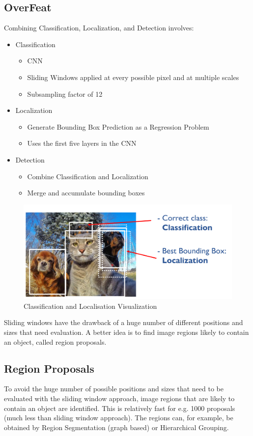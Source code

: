 \subsection{OverFeat}
Combining Classification, Localization, and Detection involves:
\begin{itemize}
	\item Classification
	\begin{itemize}
		\item CNN
		\item Sliding Windows applied at every possible pixel and at multiple scales
		\item Subsampling factor of 12
	\end{itemize}
	\item Localization
	\begin{itemize}
		\item Generate Bounding Box Prediction as a Regression Problem
		\item Uses the first five layers in the CNN
	\end{itemize}
	\item Detection
	\begin{itemize}
		\item Combine Classification and Localization
		\item Merge and accumulate bounding boxes
	\end{itemize}
\end{itemize}

\begin{figure}[h]
	\centering
	\includegraphics[width=0.7\linewidth]{img/classification_localisation}
	\caption{Classification and Localisation Visualization}
	\label{fig:classificationlocalisation}
\end{figure}

Sliding windows have the drawback of a huge number of different positions and sizes that need evaluation.
A better idea is to find image regions likely to contain an object, called region proposals.

\subsection{Region Proposals}
To avoid the huge number of possible positions and sizes that need to be evaluated with the sliding window approach,
image regions that are likely to contain an object are identified. This is relatively fast for e.g. 1000 proposals (much less than sliding window approach).
The regions can, for example, be obtained by Region Segmentation (graph based) or Hierarchical Grouping.


